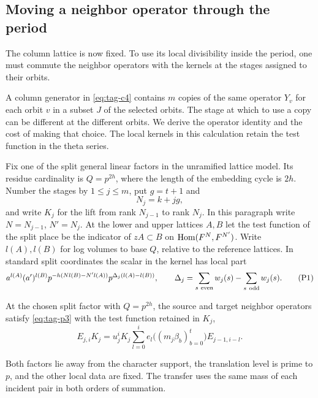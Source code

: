 \subsection{Moving a neighbor operator through the period}
\label{subsec:hecke-period}

The column lattice is now fixed. To use its local divisibility inside the period, one must commute the neighbor operators with the kernels at the stages assigned to their orbits.

\newcommand{\hecbin}[2]{\genfrac{[}{]}{0pt}{}{#1}{#2}_{Q}}

A column generator in \eqref{eq:tag-c4} contains \(m\) copies of the same
operator \(Y_v\) for each orbit \(v\) in a subset \(J\) of the
selected orbits. The stage at which to use a copy can be different
at the different orbits. We derive the operator identity and the
cost of making that choice. The local kernels in this calculation
retain the test function in the theta series.

Fix one of the split general linear factors in the unramified
lattice model. Its residue cardinality is \(Q=p^{2h}\), where the
length of the embedding cycle is \(2h\). Number the stages by
\(1\le j\le m\), put \(g=t+1\) and 
\[
  N_j=k+jg,
\]
 and write
\(K_j\) for the lift from rank \(N_{j-1}\) to rank \(N_j\).
In this paragraph write \(N=N_{j-1}\), \(N'=N_j\).
At the lower and upper lattices \(A,B\) let the test function of
the split place be the indicator of \(zA\subset B\) on
\({\rm Hom}(F^N,F^{N'})\). Write \(l(A),l(B)\) for log volumes
to base \(Q\), relative to the reference lattices. In standard
split coordinates the scalar in the kernel has local part
\[
 a^{l(A)}(a')^{l(B)}
 p^{-h(Nl(B)-N'l(A))}
 p^{\Delta_j(l(A)-l(B))},\qquad
 \Delta_j=\sum_{s\ {\rm even}}w_j(s)-\sum_{s\ {\rm odd}}w_j(s).
 \tag{P1}\label{eq:tag-p1}
\]
\begin{proposition}\label{prop:hecke-period-neighbor-identity}
At the chosen split factor with \(Q=p^{2h}\), the source and target neighbor operators satisfy \textup{\eqref{eq:tag-p3}} with the test function retained in \(K_j\),
\[
 E_{j,i}K_j=u_j^iK_j\sum_{l=0}^i e_l\big((m_j\beta_b)_{b=0}^t\big)E_{j-1,i-l}.
\]

Both factors lie away from the character support, the
translation level is prime to \(p\), and the other local
data are fixed. The transfer uses
the same mass of each incident pair in both orders of summation.
\end{proposition}

